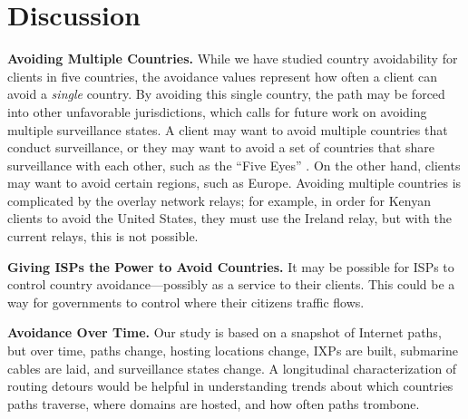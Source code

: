 \section{Discussion}
\label{discussion}

{\bf Avoiding Multiple Countries.} While we have studied country avoidability for clients in five countries, the avoidance values represent how often a client can avoid a \textit{single} country.  By avoiding this single country, the path may be forced into other unfavorable jurisdictions, which calls for future work on avoiding multiple surveillance states.  A client may want to avoid multiple countries that conduct surveillance, or they may want to avoid a set of countries that share surveillance with each other, such as the ``Five Eyes'' \cite{fiveeyes}.  On the other hand, clients may want to avoid certain regions, such as Europe.  Avoiding multiple countries is complicated by the overlay network relays; for example, in order for Kenyan clients to avoid the United States, they must use the Ireland relay, but with the current relays, this is not possible.

{\bf Giving ISPs the Power to Avoid Countries.}  It may be possible for ISPs to control country avoidance---possibly as a service to their clients.  This could be a way for governments to control where their citizens traffic flows.

{\bf Avoidance Over Time.}  Our study is based on a snapshot of Internet paths, but over time, paths change, hosting locations change, IXPs are built, submarine cables are laid, and surveillance states change.  A longitudinal characterization of routing detours would be helpful in understanding trends about which countries paths traverse, where domains are hosted, and how often paths trombone.
